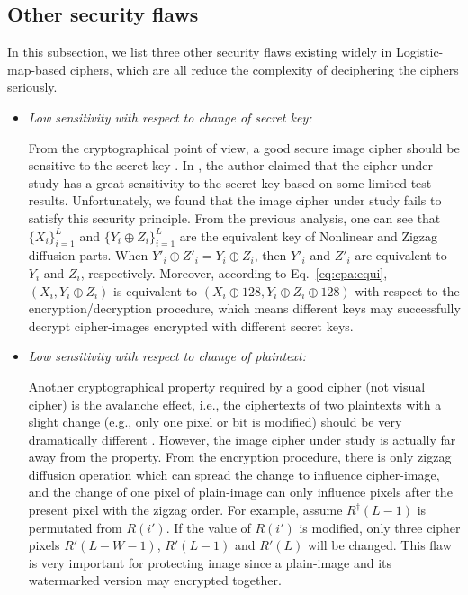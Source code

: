\documentclass{ws-ijbc}
\begin{document}
\subsection{Other security flaws}

In this subsection, we list three other security flaws existing widely in Logistic-map-based ciphers, which
are all reduce the complexity of deciphering the ciphers seriously.
\begin{itemize}
\item \textit{Low sensitivity with respect to change of secret key:}

From the cryptographical point of view, a good secure image cipher should be sensitive to the secret key \cite{Schneier:Applied:2007}.
In \cite[Sec.~4.3]{Sam:TLM:MTA2012}, the author claimed that
the cipher under study has a great sensitivity to the secret key
based on some limited test results. Unfortunately, we found that
the image cipher under study fails to satisfy this security principle.
From the previous analysis, one can see that
$\{X_{i}\}_{i=1}^{L}$ and
$\{Y_{i}\oplus Z_{i}\}_{i=1}^{L}$ are the
equivalent key of Nonlinear and Zigzag diffusion parts. When
$Y'_{i}\oplus Z'_{i} = Y_{i}\oplus Z_{i}$,
then $Y'_{i}$ and $Z'_{i}$ are equivalent to $Y_{i}$ and
$Z_{i}$, respectively. Moreover, according to Eq.~\eqref{eq:cpa:equi},
$\left(X_{i}, Y_{i}\oplus Z_{i}\right)$ is equivalent
to $\left(X_{i}\oplus 128, Y_{i}\oplus Z_{i}\oplus 128\right)$
with respect to the encryption/decryption procedure, which means different keys
may successfully decrypt cipher-images encrypted with different secret keys.

\item \textit{Low sensitivity with respect to change of plaintext:}

Another cryptographical property required by a good
cipher (not visual cipher) is the avalanche effect, i.e., the ciphertexts
of two plaintexts with a slight change (e.g., only one pixel or bit is modified)
should be very dramatically different \cite{Schneier:Applied:2007}.
However, the image cipher under study is actually far away
from the property. From the encryption procedure,
there is only zigzag diffusion operation which can spread
the change to influence cipher-image,
and the change of one pixel of plain-image can only influence
pixels after the present pixel with the zigzag order.
For example, assume $R^{\dagger}(L-1)$ is permutated from $R(i')$.
If the value of $R(i')$ is modified, only three cipher pixels
$R'(L-W-1)$, $R'(L-1)$ and $R'(L)$ will be changed. This flaw is very important for
protecting image since a plain-image and its watermarked version may encrypted together.


\end{itemize}
\end{document}

